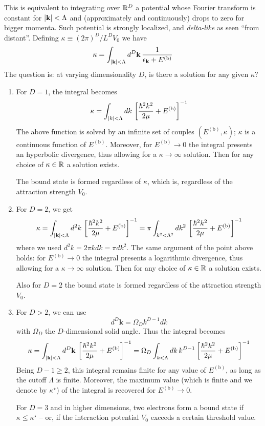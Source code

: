 This is equivalent to integrating over $\mathbb{R}^D$ a potential whose Fourier transform is constant for $\abs{\mathbf{k}} < \Lambda$ and (approximately and continuously) drops to zero for bigger momenta. Such potential is strongly localized, and \textit{delta-like} as seen ``from distant''. Defining $\kappa \equiv (2\pi)^D/ L^D V_0$ we have
\[
	\kappa = \int_{\abs{\mathbf{k}}<\Lambda} d^D \mathbf{k} \, \frac{1}{\epsilon_\mathbf{k} + E^{(\mathrm{b})}}
\]
The question is: at varying dimensionality $D$, is there a solution for any given $\kappa$?

\begin{enumerate}
	\item For $D=1$, the integral becomes
	\[
		\kappa = \int_{\abs{k}<\Lambda} dk \, \left[{\frac{\hbar^2 k^2}{2\mu} + E^{(\mathrm{b})}}\right]^{-1}
	\]
	The above function is solved by an infinite set of couples $(E^{(\mathrm{b})},\kappa)$; $\kappa$ is a continuous function of $E^{(\mathrm{b})}$. Moreover, for $E^{(\mathrm{b})} \to 0$ the integral presents an hyperbolic divergence, thus allowing for a $\kappa\to\infty$ solution. Then for any choice of $\kappa\in\mathbb{R}$ a solution exists. 
	
	The bound state is formed regardless of $\kappa$, which is, regardless of the attraction strength $V_0$.
	\item For $D=2$, we get
	\[
		\kappa = \int_{\abs{\mathbf{k}}<\Lambda} d^2 k \, \left[{\frac{\hbar^2 k^2}{2\mu} + E^{(\mathrm{b})}}\right]^{-1} = \pi \int_{k^2 < \Lambda^2} d k^2 \, \left[{\frac{\hbar^2 k^2}{2\mu} + E^{(\mathrm{b})}}\right]^{-1}
	\]
	where we used $d^2 k = 2\pi k dk = \pi dk^2$. The same argument of the point above holds: for $E^{(\mathrm{b})} \to 0$ the integral presents a logarithmic divergence, thus allowing for a $\kappa\to\infty$ solution. Then for any choice of $\kappa\in\mathbb{R}$ a solution exists.
	
	Also for $D=2$ the bound state is formed regardless of the attraction strength $V_0$.
	
	\item For $D>2$, we can use
	\[
		d^D \mathbf{k} = \Omega_D k^{D-1} dk
	\]
	with $\Omega_D$ the $D$-dimensional solid angle. Thus the integral becomes
	\[
		\kappa = \int_{\abs{\mathbf{k}}<\Lambda} d^D \mathbf{k} \, \left[{\frac{\hbar^2 k^2}{2\mu} + E^{(\mathrm{b})}}\right]^{-1} = \Omega_D \int_{k<\Lambda} dk \, k^{D-1} \left[{\frac{\hbar^2 k^2}{2\mu} + E^{(\mathrm{b})}}\right]^{-1} 
	\]
	Being $D-1 \ge 2$, this integral remains finite for any value of $E^{(\mathrm{b})}$, as long as the cutoff $\Lambda$ is finite. Moreover, the maximum value (which is finite and we denote by $\kappa^\star$) of the integral is recovered for $E^{(\mathrm{b})} \to 0$.
	
	For $D=3$ and in higher dimensions, two electrons form a bound state if $\kappa \le \kappa^\star$ -- or, if the interaction potential $V_0$ exceeds a certain threshold value.
\end{enumerate}

